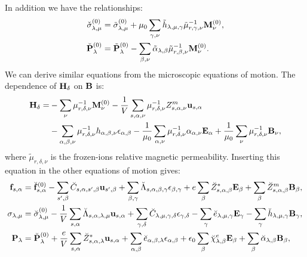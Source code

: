 \documentclass[12pt,a4paper]{article}
\begin{document}
In addition we have the relationships:
\begin{align}
\check \sigma^{(0)}_{\lambda,\mu} &= \tilde \sigma^{(0)}_{\lambda,\mu}
+ \mu_0 \sum_{\gamma,\nu} \tilde h_{\lambda,\mu,\gamma} 
\tilde \mu^{-1}_{r,\gamma,\nu} {\bf M}^{(0)}_\nu,  \\
\check {\bf P}^{(0)}_{\lambda} &= \tilde {\bf P}^{(0)}_{\lambda}
- \sum_{\beta,\nu} \tilde \alpha_{\lambda,\beta} 
\tilde \mu^{-1}_{r,\beta,\nu} {\bf M}^{(0)}_\nu. 
\end{align}
We can derive similar equations from the microscopic equations of motion.
The dependence of ${\bf H}_\delta$ on ${\bf B}$ is:
\begin{align}
{\bf H}_\delta = 
&- \sum_\nu \mu^{-1}_{r,\delta,\nu} {\bf M}^{(0)}_\nu 
-{1\over V} \sum_{s,\alpha,\nu} \mu^{-1}_{r,\delta,\nu} Z^m_{s,\alpha,\nu}
{\bf u}_{s,\alpha} \nonumber\\
&- \sum_{\alpha,\beta,\nu} \mu^{-1}_{r,\delta,\nu} h_{\alpha,\beta,\nu}
\epsilon_{\alpha,\beta} - {1\over \mu_0} \sum_{\alpha,\nu}
\mu^{-1}_{r,\delta,\nu} \alpha_{\alpha,\nu} {\bf E}_\alpha
+ {1\over \mu_0} \sum_\nu \mu^{-1}_{r,\delta,\nu} {\bf B}_\nu, 
\end{align}
where $\tilde \mu_{r,\delta,\nu}$ is the frozen-ions relative magnetic
permeability.
Inserting this equation in the other equations of motion gives:
\begin{align}
{\bf f}_{s,\alpha}&= \breve{\bf f}^{(0)}_{s,\alpha}
-\sum_{s',\beta} \breve C_{s,\alpha,s',\beta} {\bf u}_{s',\beta}
+\sum_{\beta,\gamma}
\breve \Lambda_{s,\alpha,\beta,\gamma} 
\epsilon_{\beta,\gamma} +
e \sum_{\beta} \breve Z^*_{s,\alpha,\beta} {\bf E}_{\beta}
+\sum_{\beta} 
\breve Z^m_{s,\alpha,\beta} {\bf B}_{\beta}, \\
\sigma_{\lambda,\mu}&= \breve  \sigma_{\lambda,\mu}^{(0)}
-{1\over V} \sum_{s,\alpha}
\breve \Lambda_{s,\alpha,\lambda,\mu} {\bf u}_{s,\alpha}
+\sum_{\gamma,\delta} \breve C_{\lambda,\mu,\gamma,\delta}  
\epsilon_{\gamma,\delta} -
\sum_{\gamma} \breve e_{\lambda,\mu,\gamma} 
 {\bf E}_{\gamma}
-\sum_{\gamma}  \breve h_{\lambda,\mu,\gamma} 
{\bf B}_{\gamma}, \\
{\bf P}_{\lambda}&=  \breve {\bf P}^{(0)}_{\lambda}
+{e\over V} \sum_{s,\alpha} \breve Z^*_{s,\alpha,\lambda} 
{\bf u}_{s,\alpha} +
\sum_{\alpha,\beta} \breve e_{\alpha,\beta,\lambda} 
\epsilon_{\alpha,\beta} +
\epsilon_0 \sum_{\beta} 
\breve \chi^e_{\lambda,\beta}
{\bf E}_{\beta} +
\sum_{\beta} \breve \alpha_{\lambda,\beta} 
{\bf B}_{\beta}, 
\end{align}
\end{document}
